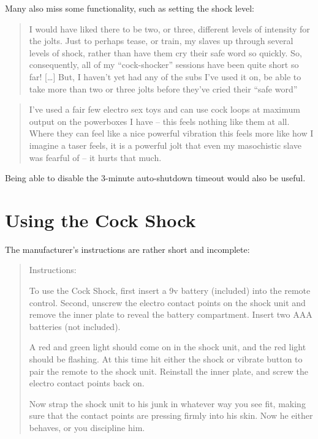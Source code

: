 \documentclass[a4paper]{article}
\begin{document}
Many also miss some functionality, such as setting the shock level:

\begin{quotation}
I would have liked there to be two, or three, different levels of intensity for the jolts. Just to perhaps tease, or train, my slaves up through several levels of shock, rather than have them cry their safe word so quickly. So, consequently, all of my “cock-shocker” sessions have been quite short so far! […] But, I haven’t yet had any of the subs I’ve used it on, be able to take more than two or three jolts before they’ve cried their “safe word”\cite{Ellison2016}
\end{quotation}

\begin{quotation}
I’ve used a fair few electro sex toys and can use cock loops at maximum output on the powerboxes I have – this feels nothing like them at all. Where they can feel like a nice powerful vibration this feels more like how I imagine a taser feels, it is a powerful jolt that even my masochistic slave was fearful of – it hurts that much.\cite{Decerous2016}
\end{quotation}

Being able to disable the 3-minute auto-shutdown timeout would also be useful.

\section{Using the Cock Shock}

The manufacturer's instructions are rather short and incomplete:

\begin{quotation}
Instructions:

To use the Cock Shock, first insert a 9v battery (included) into the remote control. Second, unscrew the electro contact points on the shock unit and remove the inner plate to reveal the battery compartment. Insert two AAA batteries (not included).

A red and green light should come on in the shock unit, and the red light should be flashing. At this time hit either the shock or vibrate button to pair the remote to the shock unit. Reinstall the inner plate, and screw the electro contact points back on.

Now strap the shock unit to his junk in whatever way you see fit, making sure that the contact points are pressing firmly into his skin. Now he either behaves, or you discipline him.\cite{MasterSeriesCockShockInstructions}
\end{quotation}
\end{document}
